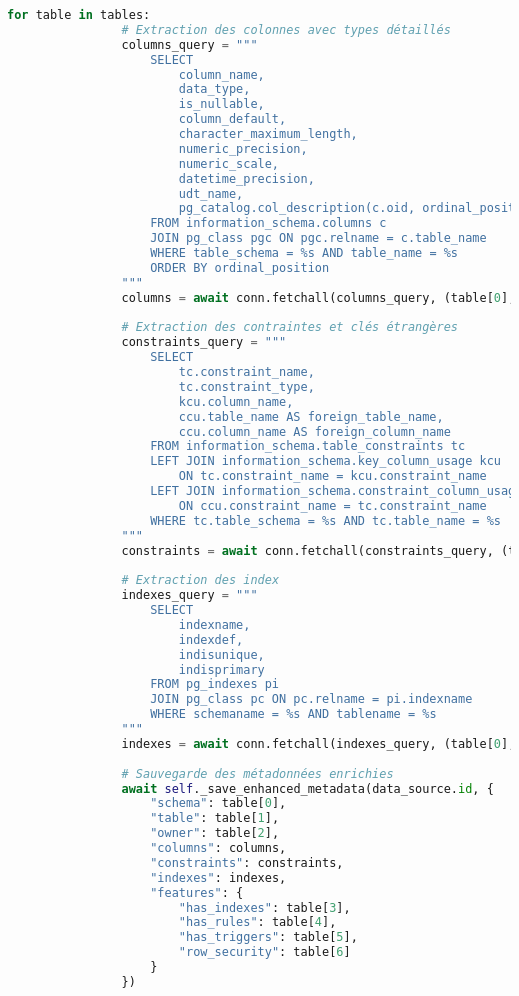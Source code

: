 \begin{lstlisting}[language=Python, caption=Service DataSourceService - Résolution des Limitations Microsoft Purview]
            for table in tables:
                # Extraction des colonnes avec types détaillés
                columns_query = """
                    SELECT 
                        column_name,
                        data_type,
                        is_nullable,
                        column_default,
                        character_maximum_length,
                        numeric_precision,
                        numeric_scale,
                        datetime_precision,
                        udt_name,
                        pg_catalog.col_description(c.oid, ordinal_position) as comment
                    FROM information_schema.columns c
                    JOIN pg_class pgc ON pgc.relname = c.table_name
                    WHERE table_schema = %s AND table_name = %s
                    ORDER BY ordinal_position
                """
                columns = await conn.fetchall(columns_query, (table[0], table[1]))
                
                # Extraction des contraintes et clés étrangères
                constraints_query = """
                    SELECT 
                        tc.constraint_name,
                        tc.constraint_type,
                        kcu.column_name,
                        ccu.table_name AS foreign_table_name,
                        ccu.column_name AS foreign_column_name
                    FROM information_schema.table_constraints tc
                    LEFT JOIN information_schema.key_column_usage kcu
                        ON tc.constraint_name = kcu.constraint_name
                    LEFT JOIN information_schema.constraint_column_usage ccu
                        ON ccu.constraint_name = tc.constraint_name
                    WHERE tc.table_schema = %s AND tc.table_name = %s
                """
                constraints = await conn.fetchall(constraints_query, (table[0], table[1]))
                
                # Extraction des index
                indexes_query = """
                    SELECT 
                        indexname,
                        indexdef,
                        indisunique,
                        indisprimary
                    FROM pg_indexes pi
                    JOIN pg_class pc ON pc.relname = pi.indexname
                    WHERE schemaname = %s AND tablename = %s
                """
                indexes = await conn.fetchall(indexes_query, (table[0], table[1]))
                
                # Sauvegarde des métadonnées enrichies
                await self._save_enhanced_metadata(data_source.id, {
                    "schema": table[0],
                    "table": table[1],
                    "owner": table[2],
                    "columns": columns,
                    "constraints": constraints,
                    "indexes": indexes,
                    "features": {
                        "has_indexes": table[3],
                        "has_rules": table[4],
                        "has_triggers": table[5],
                        "row_security": table[6]
                    }
                })
                

\end{lstlisting}
